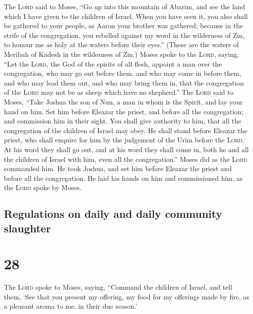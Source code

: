  The \textsc{Lord} said to Moses, ``Go up into this
mountain of Abarim, and see the land which I have given to the children
of Israel.  When you have seen it, you also shall be
gathered to your people, as Aaron your brother was gathered;
 because in the strife of the congregation, you rebelled
against my word in the wilderness of Zin, to honour me as holy at the
waters before their eyes.'' (These are the waters of Meribah of Kadesh
in the wilderness of Zin.)  Moses spoke to the
\textsc{Lord}, saying,  ``Let the \textsc{Lord}, the God
of the spirits of all flesh, appoint a man over the congregation,
 who may go out before them, and who may come in before
them, and who may lead them out, and who may bring them in, that the
congregation of the \textsc{Lord} may not be as sheep which have no
shepherd.''  The \textsc{Lord} said to Moses, ``Take
Joshua the son of Nun, a man in whom is the Spirit, and lay your hand on
him.  Set him before Eleazar the priest, and before all
the congregation; and commission him in their sight.  You
shall give authority to him, that all the congregation of the children
of Israel may obey.  He shall stand before Eleazar the
priest, who shall enquire for him by the judgement of the Urim before
the \textsc{Lord}. At his word they shall go out, and at his word they
shall come in, both he and all the children of Israel with him, even all
the congregation.''  Moses did as the \textsc{Lord}
commanded him. He took Joshua, and set him before Eleazar the priest and
before all the congregation.  He laid his hands on him
and commissioned him, as the \textsc{Lord} spoke by Moses.

\hypertarget{regulations-on-daily-and-daily-community-slaughter}{%
\subsection{Regulations on daily and daily community
slaughter}\label{regulations-on-daily-and-daily-community-slaughter}}

\hypertarget{section-27}{%
\section{28}\label{section-27}}

 The \textsc{Lord} spoke to Moses, saying, 
``Command the children of Israel, and tell them, `See that you present
my offering, my food for my offerings made by fire, as a pleasant aroma
to me, in their due season.'

